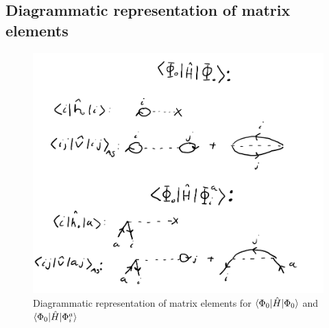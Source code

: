 \documentclass{article}
\newcommand{\inner}[3]{\braket{#1|#2|#3}}
\begin{document}
\begin{appendix}
    \section{Diagrammatic representation of matrix elements}\label{sec:app:diagrams}
    \begin{figure}[H]
        \centering
        \includegraphics[width=\linewidth]{gs_1p1h_croped.pdf}
        \caption{Diagrammatic representation of matrix elements for $\inner{\Phi_0}{\hat{H}}{\Phi_0}$ and $\inner{\Phi_0}{\hat{H}}{\Phi_{i}^a}$}\label{fig:gs_1p1h}
    \end{figure}


\end{appendix}
\end{document}
